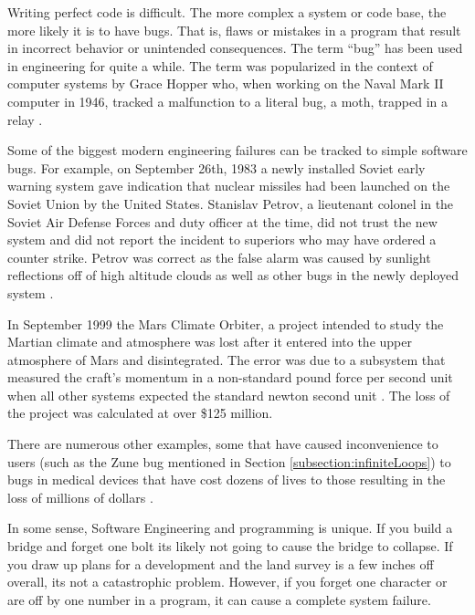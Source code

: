 

Writing perfect code is difficult.  The more complex a system or
code base, the more likely it is to have  \glspl{bug}.  That is, flaws
or mistakes in a program that result in incorrect behavior or 
unintended consequences.  The term ``bug'' has been used in
engineering for quite a while.  The term was popularized in the
context of computer systems by Grace Hopper who, when working
on the Naval Mark II computer in 1946, tracked a malfunction to
a literal bug, a moth, trapped in a relay \cite{hopperBug11}.

Some of the biggest modern engineering failures can be
tracked to simple software bugs.  For example, on September 
26th, 1983 a newly installed Soviet early warning 
system gave indication that nuclear missiles had been launched 
on the Soviet Union by the United States.  Stanislav Petrov, a 
lieutenant colonel in the Soviet Air Defense Forces and duty officer 
at the time, did not trust the new system and did not report the
incident to superiors who may have ordered a counter strike.  
Petrov was correct as the false alarm was caused by sunlight
reflections off of high altitude clouds as well as other bugs in 
the newly deployed system \cite{stanislav83}.  

In September 1999 the Mars Climate Orbiter, a project intended to
study the Martian climate and atmosphere was lost after it entered
into the upper atmosphere of Mars and disintegrated.
The error was due to a subsystem that 
measured the craft's momentum in a non-standard pound force per 
second unit when all other systems expected the standard newton
second unit \cite{mars1999}.  The loss of the project was
calculated at over \$125 million.

There are numerous other examples, some that have caused
inconvenience to users (such as the Zune bug mentioned in 
Section \ref{subsection:infiniteLoops}) to bugs in medical devices
that have cost dozens of lives to those resulting in the loss of
millions of dollars \cite{wikipediaListofBugs}.

In some sense, Software Engineering and programming 
is unique.  If you build a bridge and forget one bolt its likely 
not going to cause the bridge to collapse.  If you draw up 
plans for a development and the land survey is a few inches 
off overall, its not a catastrophic problem.  However, if you 
forget one character or are off by one number in a program, 
it can cause a complete system failure.

